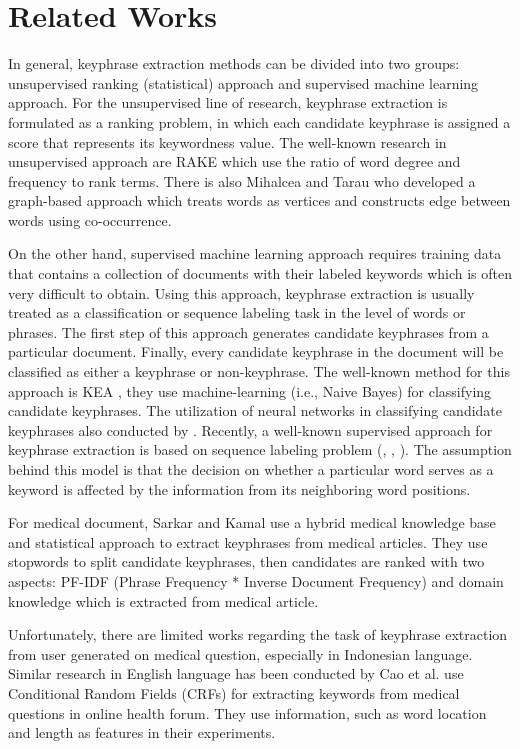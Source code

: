 \documentclass[sigconf]{acmart}
\begin{document}
\section{Related Works}
In general, keyphrase extraction methods can be divided into two groups: unsupervised ranking (statistical) approach and supervised machine learning approach. For the unsupervised line of research, keyphrase extraction is formulated as a ranking problem, in which each candidate keyphrase is assigned a score that represents its keywordness value. The well-known research in unsupervised approach are RAKE \cite{rake} which use the ratio of word degree and frequency to rank terms. There is also Mihalcea and Tarau \cite{mihalcea2004textrank} who developed a graph-based approach which treats words as vertices and constructs edge between words using co-occurrence.

On the other hand, supervised machine learning approach requires training data that contains a collection of documents with their labeled keywords which is often very difficult to obtain. Using this approach, keyphrase extraction is usually treated as a classification or sequence labeling task in the level of words or phrases. The first step of this approach generates candidate keyphrases from a particular document. Finally, every candidate keyphrase in the document will be classified as either a keyphrase or non-keyphrase. The well-known method for this approach is KEA \cite{witten1999kea}, they use machine-learning (i.e., Naive Bayes) for classifying candidate keyphrases. The utilization of neural networks in classifying candidate keyphrases also conducted by \cite{ekpNeuralNetworks}. Recently, a well-known supervised approach for keyphrase extraction is based on sequence labeling problem (\cite{zhang2008automatic}, \cite{cao2010automatically}, \cite{zhang2016keyphrase}). The assumption behind this model is that the decision on whether a particular word serves as a keyword is affected by the information from its neighboring word positions.

For medical document, Sarkar and Kamal \cite{ekpMedicalDocumentHybrid} use a hybrid medical knowledge base and statistical approach to extract keyphrases from medical articles. They use stopwords to split candidate keyphrases, then candidates are ranked with two aspects: PF-IDF (Phrase Frequency * Inverse Document Frequency) and domain knowledge which is extracted from medical article.

Unfortunately, there are limited works regarding the task of keyphrase extraction from user generated on medical question, especially in Indonesian language. Similar research in English language has been conducted by Cao et al. \cite{cao2010automatically} use Conditional Random Fields (CRFs) for extracting keywords from medical questions in online health forum. They use information, such as word location and length as features in their experiments.
\end{document}
